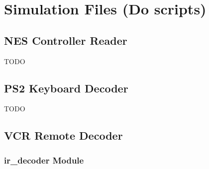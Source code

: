 \documentclass[a4paper]{article}
\makeatletter
\newcommand{\filecaption}[1]{\filename@parse{#1}\filename@base.\filename@ext}
\newcommand{\filelisting}[2][]{%
}
\makeatother
\begin{document}
\section{Simulation Files (Do scripts)}

\subsection{NES Controller Reader}
TODO

\subsection{PS2 Keyboard Decoder}
TODO

\subsection{VCR Remote Decoder}

\subsubsection{ir\_decoder Module}
\filelisting[float]{../do_files/vcr_remote/setup.do}
\filelisting[float]{../do_files/vcr_remote/reset.do}
\filelisting[float,label=lst:sim_vcr_ir_decoder_0]{../do_files/vcr_remote/0.do}
\filelisting[float,label=lst:sim_vcr_ir_decoder_1]{../do_files/vcr_remote/1.do}
\filelisting[float,label=lst:sim_vcr_ir_decoder_2]{../do_files/vcr_remote/2.do}
\filelisting[float,label=lst:sim_vcr_ir_decoder_3]{../do_files/vcr_remote/3.do}
\filelisting[float,label=lst:sim_vcr_ir_decoder_4]{../do_files/vcr_remote/4.do}
\filelisting[float,label=lst:sim_vcr_ir_decoder_5]{../do_files/vcr_remote/5.do}
\filelisting[float,label=lst:sim_vcr_ir_decoder_6]{../do_files/vcr_remote/6.do}
\filelisting[float,label=lst:sim_vcr_ir_decoder_7]{../do_files/vcr_remote/7.do}
\filelisting[float,label=lst:sim_vcr_ir_decoder_8]{../do_files/vcr_remote/8.do}
\filelisting[float,label=lst:sim_vcr_ir_decoder_9]{../do_files/vcr_remote/9.do}
\filelisting[float,label=lst:sim_vcr_ir_decoder_sequence]{../do_files/vcr_remote/sequence.do}
\filelisting[float,label=lst:sim_vcr_ir_decoder_bad_checksum]{../do_files/vcr_remote/bad_checksum.do}

\printbibliography
\end{document}
